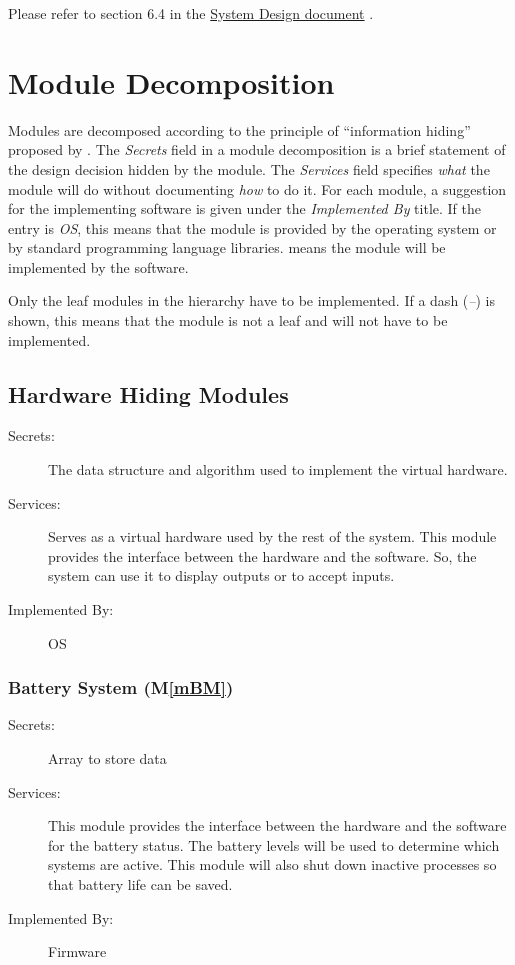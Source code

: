 \documentclass[12pt, titlepage]{article}
\newcommand{\mref}[1]{M\ref{#1}}
\begin{document}
Please refer to section 6.4 in the \href{https://github.com/zakerl/Capstone_Project/blob/main/docs/Design/SystDesign/SystDes.pdf}{System Design document} .

\section{Module Decomposition} \label{SecMD}

Modules are decomposed according to the principle of ``information hiding''
proposed by \citet{ParnasEtAl1984}. The \emph{Secrets} field in a module
decomposition is a brief statement of the design decision hidden by the
module. The \emph{Services} field specifies \emph{what} the module will do
without documenting \emph{how} to do it. For each module, a suggestion for the
implementing software is given under the \emph{Implemented By} title. If the
entry is \emph{OS}, this means that the module is provided by the operating
system or by standard programming language libraries.  \emph{\progname{}} means the
module will be implemented by the \progname{} software.

Only the leaf modules in the hierarchy have to be implemented. If a dash
(\emph{--}) is shown, this means that the module is not a leaf and will not have
to be implemented.

\subsection{Hardware Hiding Modules}

\begin{description}
  \item[Secrets:]The data structure and algorithm used to implement the virtual
  hardware.
  \item[Services:]Serves as a virtual hardware used by the rest of the
  system. This module provides the interface between the hardware and the
  software. So, the system can use it to display outputs or to accept inputs.
  \item[Implemented By:] OS
\end{description}

\subsubsection{Battery System (\mref{mBM})}
\begin{description}
  \item[Secrets:] Array to store data
  \item[Services:] This module provides the interface between the hardware and the
    software for the battery status. The battery levels will be used to determine which systems are active. This module will also shut down inactive processes so that battery life can be saved.
  \item[Implemented By:] Firmware
\end{description}
\end{document}
